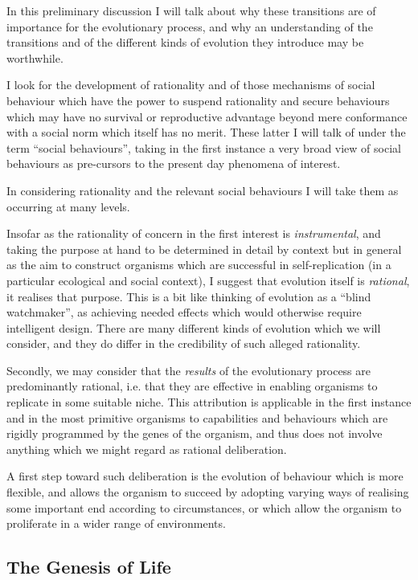 \documentclass[10pt,titlepage]{book}
\begin{document}
In this preliminary discussion I will talk about why these transitions are of importance for the evolutionary process, and why an understanding of the transitions and of the different kinds of evolution they introduce may be worthwhile.

I look for the development of rationality and of those mechanisms of social behaviour which have the power to suspend rationality and secure behaviours which may have no survival or reproductive advantage beyond mere conformance with a social norm which itself has no merit.
These latter I will talk of under the term ``social behaviours'', taking in the first instance a very broad view of social behaviours as pre-cursors to the present day phenomena of interest.

In considering rationality and the relevant social behaviours I will take them as occurring at many levels.

Insofar as the rationality of concern in the first interest is \emph{instrumental}, and taking the purpose at hand to be determined in detail by context but in general as the aim to construct organisms which are successful in self-replication (in a particular ecological and social context), I suggest that evolution itself is \emph{rational}, it realises that purpose.
This is a bit like thinking of evolution as a ``blind watchmaker'', as achieving needed effects which would otherwise require intelligent design.
There are many different kinds of evolution which we will consider, and they do differ in the credibility of such alleged rationality.

Secondly, we may consider that the \emph{results} of the evolutionary process are predominantly rational, i.e. that they are effective in enabling organisms to replicate in some suitable niche.
This attribution is applicable in the first instance and in the most primitive organisms to capabilities and behaviours which are rigidly programmed by the genes of the organism, and thus does not involve anything which we might regard as rational deliberation.

A first step toward such deliberation is the evolution of behaviour which is more flexible, and allows the organism to succeed by adopting varying ways of realising some important end according to circumstances, or which allow the organism to proliferate in a wider range of environments.

\subsection{The Genesis of Life}
\end{document}
